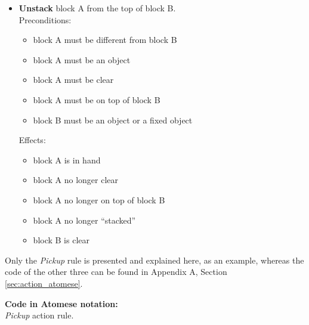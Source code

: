 \begin{itemize}
	\item \textbf{Unstack} block A from the top of block B. \\
Preconditions:
	\begin{itemize}
		\item block A must be different from block B
		\item block A must be an object
		\item block A must be clear
		\item block A must be on top of block B
		\item block B must be an object or a fixed object
	\end{itemize}
Effects:
	\begin{itemize}
		\item block A is in hand
		\item block A no longer clear
		\item block A no longer on top of block B
		\item block A no longer \enquote{stacked}
		\item block B is clear
	\end{itemize}
\end{itemize}
Only the \textit{Pickup} rule is presented and explained here, as an example, whereas the code of the other three can be found in Appendix A, Section \ref{sec:action_atomese}. \bigskip \\
\begin{footnotesize}
\textbf{Code in Atomese notation:} \\
\textit{Pickup} action rule.
\end{footnotesize}

